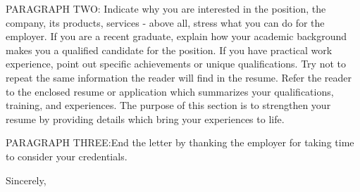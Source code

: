 \documentclass[12pt]{SCUletter}
\begin{document}
\begin{letter}
		PARAGRAPH TWO: Indicate why you are interested in the position, the company, its products, services - above all, stress what you can do for the employer. If you are a recent graduate, explain how your academic background makes you a qualified candidate for the position. If you have practical work experience, point out specific achievements or unique qualifications. Try not to repeat the same information the reader will find in the resume. Refer the reader to the enclosed resume or application which summarizes your qualifications, training, and experiences. The purpose of this section is to strengthen your resume by providing details which bring your experiences to life.
		
		PARAGRAPH THREE:End the letter by thanking the employer for taking time to consider your credentials. 
		
		\closing{Sincerely,}
		
		
		
		
	\end{letter}
	
\end{document}
